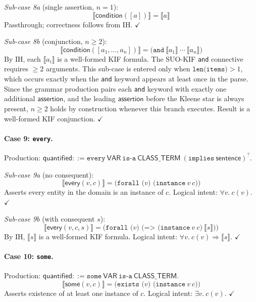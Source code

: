 \textit{Sub-case 8a} (single assertion, $n = 1$):
\begin{equation*}
  \llbracket \mathsf{condition}([a]) \rrbracket = \llbracket a \rrbracket
\end{equation*}
Passthrough; correctness follows from IH. \hfill$\checkmark$

\textit{Sub-case 8b} (conjunction, $n \geq 2$):
\begin{equation*}
  \llbracket \mathsf{condition}([a_1, \dots, a_n]) \rrbracket
    = \texttt{(and}\ \llbracket a_1 \rrbracket\ \cdots\ \llbracket a_n \rrbracket\texttt{)}
\end{equation*}
By IH, each $\llbracket a_i \rrbracket$ is a well-formed KIF formula.
The SUO-KIF \texttt{and} connective requires $\geq 2$ arguments. This sub-case
is entered only when $\texttt{len(items)} > 1$, which occurs exactly when the
\texttt{and} keyword appears at least once in the parse. Since the grammar
production pairs each \texttt{and} keyword with exactly one additional
$\mathsf{assertion}$, and the leading $\mathsf{assertion}$ before the Kleene star
is always present, $n \geq 2$ holds by construction whenever this branch executes.
Result is a well-formed KIF conjunction. \hfill$\checkmark$

\paragraph{Case 9: \texttt{every}.}
Production: $\mathsf{quantified} ::= \texttt{every}\ \mathsf{VAR}\ \texttt{is-a}\ \mathsf{CLASS\_TERM}\ (\texttt{implies}\ \mathsf{sentence})^{?}$.

\textit{Sub-case 9a} (no consequent):
\begin{equation*}
  \llbracket \mathsf{every}(v, c) \rrbracket
    = \texttt{(forall (}v\texttt{) (instance}\ v\ c\texttt{))}
\end{equation*}
Asserts every entity in the domain is an instance of $c$.
Logical intent: $\forall v.\ c(v)$. \hfill$\checkmark$

\textit{Sub-case 9b} (with consequent $s$):
\begin{equation*}
  \llbracket \mathsf{every}(v, c, s) \rrbracket
    = \texttt{(forall (}v\texttt{) (=>\ (instance}\ v\ c\texttt{)}\ \llbracket s \rrbracket\texttt{))}
\end{equation*}
By IH, $\llbracket s \rrbracket$ is a well-formed KIF formula.
Logical intent: $\forall v.\ c(v) \Rightarrow \llbracket s \rrbracket$. \hfill$\checkmark$

\paragraph{Case 10: \texttt{some}.}
Production: $\mathsf{quantified} ::= \texttt{some}\ \mathsf{VAR}\ \texttt{is-a}\ \mathsf{CLASS\_TERM}$.
\begin{equation*}
  \llbracket \mathsf{some}(v, c) \rrbracket
    = \texttt{(exists (}v\texttt{) (instance}\ v\ c\texttt{))}
\end{equation*}
Asserts existence of at least one instance of $c$.
Logical intent: $\exists v.\ c(v)$. \hfill$\checkmark$

